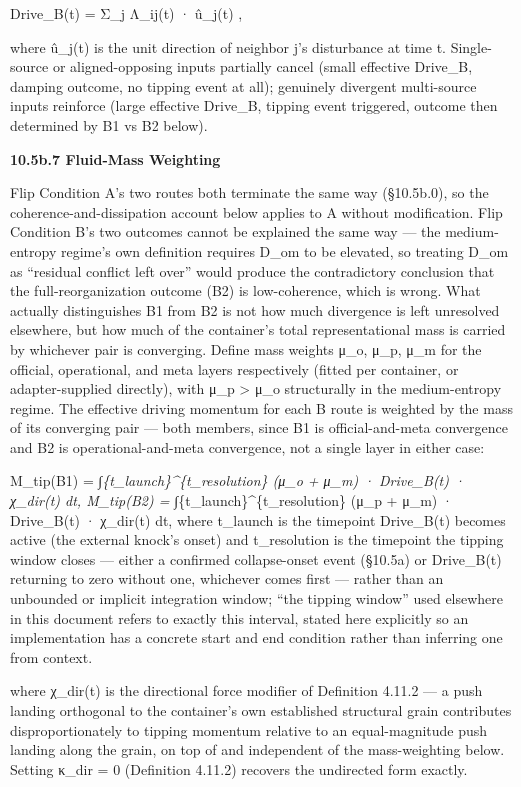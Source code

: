 \documentclass[
]{article}
\begin{document}
Drive\_B(t) = Σ\_j Λ\_ij(t) · û\_j(t) ,

where û\_j(t) is the unit direction of neighbor j's disturbance at time
t. Single-source or aligned-opposing inputs partially cancel (small
effective Drive\_B, damping outcome, no tipping event at all); genuinely
divergent multi-source inputs reinforce (large effective Drive\_B,
tipping event triggered, outcome then determined by B1 vs B2 below).

\textbf{10.5b.7 Fluid-Mass Weighting}

Flip Condition A's two routes both terminate the same way (§10.5b.0), so
the coherence-and-dissipation account below applies to A without
modification. Flip Condition B's two outcomes cannot be explained the
same way --- the medium-entropy regime's own definition requires D\_om
to be elevated, so treating D\_om as ``residual conflict left over''
would produce the contradictory conclusion that the full-reorganization
outcome (B2) is low-coherence, which is wrong. What actually
distinguishes B1 from B2 is not how much divergence is left unresolved
elsewhere, but how much of the container's total representational mass
is carried by whichever pair is converging. Define mass weights μ\_o,
μ\_p, μ\_m for the official, operational, and meta layers respectively
(fitted per container, or adapter-supplied directly), with μ\_p
\textgreater{} μ\_o structurally in the medium-entropy regime. The
effective driving momentum for each B route is weighted by the mass of
its converging pair --- both members, since B1 is official-and-meta
convergence and B2 is operational-and-meta convergence, not a single
layer in either case:

M\_tip(B1) = ∫\emph{\{t\_launch\}\^{}\{t\_resolution\} (μ\_o + μ\_m) ·
Drive\_B(t) · χ\_dir(t) dt, M\_tip(B2) =
∫}\{t\_launch\}\^{}\{t\_resolution\} (μ\_p + μ\_m) · Drive\_B(t) ·
χ\_dir(t) dt, where t\_launch is the timepoint Drive\_B(t) becomes
active (the external knock's onset) and t\_resolution is the timepoint
the tipping window closes --- either a confirmed collapse-onset event
(§10.5a) or Drive\_B(t) returning to zero without one, whichever comes
first --- rather than an unbounded or implicit integration window; ``the
tipping window'' used elsewhere in this document refers to exactly this
interval, stated here explicitly so an implementation has a concrete
start and end condition rather than inferring one from context.

where χ\_dir(t) is the directional force modifier of Definition 4.11.2
--- a push landing orthogonal to the container's own established
structural grain contributes disproportionately to tipping momentum
relative to an equal-magnitude push landing along the grain, on top of
and independent of the mass-weighting below. Setting κ\_dir = 0
(Definition 4.11.2) recovers the undirected form exactly.
\end{document}
